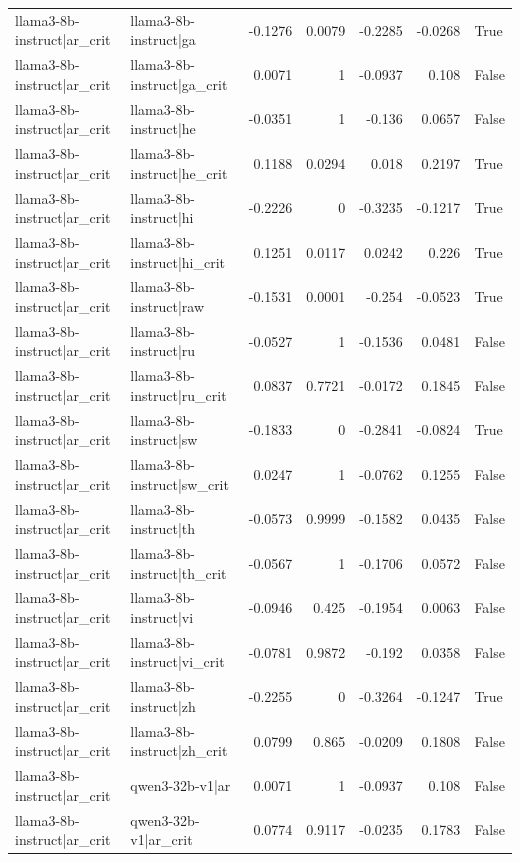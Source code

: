 \begin{table}
\begin{tabular}{l l r r r r l}
llama3-8b-instruct|ar_crit & llama3-8b-instruct|ga & -0.1276 & 0.0079 & -0.2285 & -0.0268 & True \\
llama3-8b-instruct|ar_crit & llama3-8b-instruct|ga_crit & 0.0071 & 1 & -0.0937 & 0.108 & False \\
llama3-8b-instruct|ar_crit & llama3-8b-instruct|he & -0.0351 & 1 & -0.136 & 0.0657 & False \\
llama3-8b-instruct|ar_crit & llama3-8b-instruct|he_crit & 0.1188 & 0.0294 & 0.018 & 0.2197 & True \\
llama3-8b-instruct|ar_crit & llama3-8b-instruct|hi & -0.2226 & 0 & -0.3235 & -0.1217 & True \\
llama3-8b-instruct|ar_crit & llama3-8b-instruct|hi_crit & 0.1251 & 0.0117 & 0.0242 & 0.226 & True \\
llama3-8b-instruct|ar_crit & llama3-8b-instruct|raw & -0.1531 & 0.0001 & -0.254 & -0.0523 & True \\
llama3-8b-instruct|ar_crit & llama3-8b-instruct|ru & -0.0527 & 1 & -0.1536 & 0.0481 & False \\
llama3-8b-instruct|ar_crit & llama3-8b-instruct|ru_crit & 0.0837 & 0.7721 & -0.0172 & 0.1845 & False \\
llama3-8b-instruct|ar_crit & llama3-8b-instruct|sw & -0.1833 & 0 & -0.2841 & -0.0824 & True \\
llama3-8b-instruct|ar_crit & llama3-8b-instruct|sw_crit & 0.0247 & 1 & -0.0762 & 0.1255 & False \\
llama3-8b-instruct|ar_crit & llama3-8b-instruct|th & -0.0573 & 0.9999 & -0.1582 & 0.0435 & False \\
llama3-8b-instruct|ar_crit & llama3-8b-instruct|th_crit & -0.0567 & 1 & -0.1706 & 0.0572 & False \\
llama3-8b-instruct|ar_crit & llama3-8b-instruct|vi & -0.0946 & 0.425 & -0.1954 & 0.0063 & False \\
llama3-8b-instruct|ar_crit & llama3-8b-instruct|vi_crit & -0.0781 & 0.9872 & -0.192 & 0.0358 & False \\
llama3-8b-instruct|ar_crit & llama3-8b-instruct|zh & -0.2255 & 0 & -0.3264 & -0.1247 & True \\
llama3-8b-instruct|ar_crit & llama3-8b-instruct|zh_crit & 0.0799 & 0.865 & -0.0209 & 0.1808 & False \\
llama3-8b-instruct|ar_crit & qwen3-32b-v1|ar & 0.0071 & 1 & -0.0937 & 0.108 & False \\
llama3-8b-instruct|ar_crit & qwen3-32b-v1|ar_crit & 0.0774 & 0.9117 & -0.0235 & 0.1783 & False \\

\end{tabular}
\end{table}
